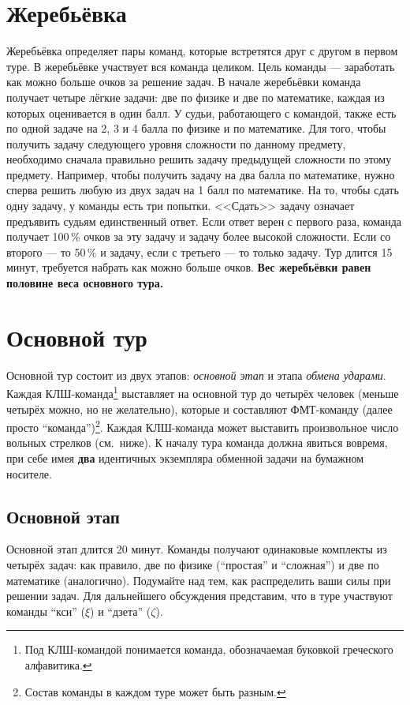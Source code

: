 \documentclass[12pt]{article}
\begin{document}
\section*{Жеребьёвка}
Жеребьёвка определяет пары команд, которые встретятся друг с другом в первом туре. В жеребьёвке участвует вся команда целиком. Цель команды --- заработать как можно больше очков за решение задач. В начале жеребьёвки команда получает четыре лёгкие задачи: две по физике и две по математике, каждая из которых оценивается в один балл. У судьи, работающего с командой, также есть по одной задаче на 2, 3 и 4 балла по физике и по математике. Для того, чтобы получить задачу следующего уровня сложности по данному предмету, необходимо сначала правильно решить задачу предыдущей сложности по этому предмету. Например, чтобы получить задачу на два балла по математике, нужно сперва решить любую из двух задач на 1 балл по математике. На то, чтобы сдать одну задачу, у команды есть три попытки. <<Сдать>> задачу означает предъявить судьям единственный ответ.  Если ответ верен с первого раза, команда получает 100\,\% очков за эту задачу и задачу более высокой сложности. Если со второго --- то 50\,\% и задачу, если с третьего --- то только задачу. Тур длится 15 минут, требуется набрать как можно больше очков. {\bf Вес жеребьёвки равен половине веса основного тура.}

\section*{Основной тур}
Основной тур состоит из двух этапов: \textsl{основной этап} и этапа \textsl{обмена ударами}. Каждая КЛШ-команда\footnote{Под КЛШ-командой понимается команда, обозначаемая буковкой греческого алфавитика.} выставляет на основной тур до четырёх человек (меньше четырёх можно, но не желательно), которые и составляют ФМТ-команду (далее просто ``команда'')\footnote{Состав команды в каждом туре может быть разным.}. Каждая КЛШ-команда может выставить произвольное число вольных стрелков (см.~ниже). К началу тура команда должна явиться вовремя, при себе имея {\bf два} идентичных экземпляра обменной задачи на бумажном носителе.

\subsection*{Основной этап}
Основной этап длится 20 минут. Команды получают одинаковые комплекты из четырёх задач: как правило, две по физике (``простая'' и ``сложная'') и две по математике (аналогично). Подумайте над тем, как распределить ваши силы при решении задач. Для дальнейшего обсуждения представим, что в туре участвуют команды ``кси'' ($\xi$) и ``дзета'' ($\zeta$).
\end{document}
